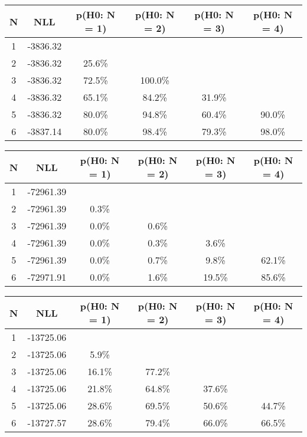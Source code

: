 \begin{table}[h!]
	\centering
	\begin{tabular}{cc||cccc}
		N & NLL & p(H0: N = 1) & p(H0: N = 2) & p(H0: N = 3) & p(H0: N = 4)\\ 
		\hline
1 & -3836.32 & & & & \\
2 & -3836.32 & 25.6\% & & & \\
3 & -3836.32 & 72.5\% & 100.0\% & & \\
4 & -3836.32 & 65.1\% & 84.2\% & 31.9\% & \\
5 & -3836.32 & 80.0\% & 94.8\% & 60.4\% & 90.0\% \\
6 & -3837.14 & 80.0\% & 98.4\% & 79.3\% & 98.0\% \\
	\end{tabular}
	\label{tab:lab}
\end{table}

\begin{table}[h!]
	\centering
	\begin{tabular}{cc||cccc}
		N & NLL & p(H0: N = 1) & p(H0: N = 2) & p(H0: N = 3) & p(H0: N = 4)\\ 
		\hline
1 & -72961.39 & & & & \\
2 & -72961.39 & 0.3\% & & & \\
3 & -72961.39 & 0.0\% & 0.6\% & & \\
4 & -72961.39 & 0.0\% & 0.3\% & 3.6\% & \\
5 & -72961.39 & 0.0\% & 0.7\% & 9.8\% & 62.1\% \\
6 & -72971.91 & 0.0\% & 1.6\% & 19.5\% & 85.6\% \\
	\end{tabular}
	\label{tab:lab}
\end{table}

\begin{table}[h!]
	\centering
	\begin{tabular}{cc||cccc}
		N & NLL & p(H0: N = 1) & p(H0: N = 2) & p(H0: N = 3) & p(H0: N = 4)\\ 
		\hline
1 & -13725.06 & & & & \\
2 & -13725.06 & 5.9\% & & & \\
3 & -13725.06 & 16.1\% & 77.2\% & & \\
4 & -13725.06 & 21.8\% & 64.8\% & 37.6\% & \\
5 & -13725.06 & 28.6\% & 69.5\% & 50.6\% & 44.7\% \\
6 & -13727.57 & 28.6\% & 79.4\% & 66.0\% & 66.5\% \\
	\end{tabular}
	\label{tab:lab}
\end{table}

